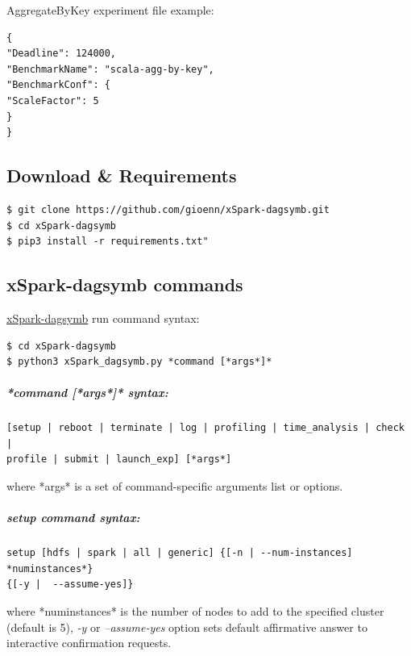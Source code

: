 AggregateByKey experiment file example:

\begin{verbatim}
{
"Deadline": 124000,
"BenchmarkName": "scala-agg-by-key",
"BenchmarkConf": {
"ScaleFactor": 5
}
}
\end{verbatim}

\hypertarget{download-requirements}{%
\subsection{Download \& Requirements}\label{download-requirements}}

\begin{verbatim}
$ git clone https://github.com/gioenn/xSpark-dagsymb.git
$ cd xSpark-dagsymb
$ pip3 install -r requirements.txt"
\end{verbatim}

\hypertarget{xspark-dagsymb-commands}{%
\subsection{xSpark-dagsymb commands}\label{xspark-dagsymb-commands}}

\href{https://github.com/gioenn/xSpark-dagsymb}{xSpark-dagsymb} run
command syntax:

\begin{verbatim}
$ cd xSpark-dagsymb
$ python3 xSpark_dagsymb.py *command [*args*]*
\end{verbatim}

\hypertarget{command-args-syntax}{%
\subparagraph{*command {[}*args*{]}*
	syntax:}\label{command-args-syntax}}

\begin{verbatim}
[setup | reboot | terminate | log | profiling | time_analysis | check | 
profile | submit | launch_exp] [*args*]
\end{verbatim}

where *args* is a set of command-specific arguments list or options.

\hypertarget{setup-command-syntax}{%
\subparagraph{\texorpdfstring{\emph{setup} command
		syntax:}{setup command syntax:}}\label{setup-command-syntax}}

\begin{verbatim}
setup [hdfs | spark | all | generic] {[-n | --num-instances] *numinstances*} 
{[-y |  --assume-yes]}
\end{verbatim}

where *numinstances* is the number of nodes to add to the specified
cluster (default is 5), \emph{-y} or \emph{--assume-yes} option sets
default affirmative answer to interactive confirmation requests.

